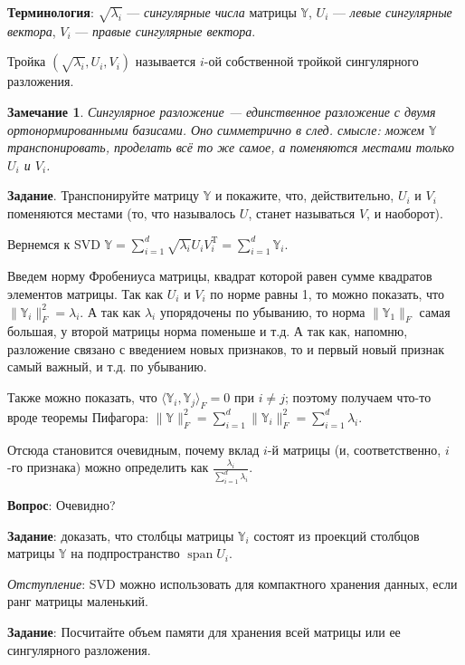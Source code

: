 \documentclass[specialist, 12pt,
subf, %
href, colorlinks=true,
substylefile = spbu.rtx,
]{disser}
\newtheorem{remark}{Замечание}
\DeclareMathOperator{\spn}{span}
\begin{document}
 \textbf{Терминология}:
 		$\sqrt{\lambda_i}$ --- \textit{сингулярные числа} матрицы $\mathbb{Y}$, $U_i$ --- \textit{левые сингулярные вектора}, $V_i$ --- \textit{правые сингулярные вектора}.
 		
 	Тройка $(\sqrt{\lambda_i},U_i,V_i)$ называется $i$-ой собственной тройкой сингулярного разложения.

\begin{remark}
	Сингулярное разложение --- единственное разложение с двумя ортонормированными базисами. Оно симметрично в след. смысле: можем $\mathbb{Y}$ транспонировать, проделать всё то же самое, а поменяются местами только $U_i$ и $V_i$.
\end{remark}

\textbf{Задание}. Транспонируйте матрицу $\mathbb{Y}$ и покажите, что, действительно, $U_i$ и $V_i$ поменяются местами (то, что называлось $U$, станет называться $V$, и наоборот).

\medskip
Вернемся к SVD $\mathbb{Y} = \sum\limits_{i = 1}^d \sqrt{\lambda_i} U_i V_i^{\mathrm{T}} = \sum\limits_{i = 1}^d \mathbb{Y}_i$.

Введем норму Фробениуса матрицы, квадрат которой равен сумме квадратов элементов матрицы. Так как $U_i$ и $V_i$ по норме равны 1, то можно показать, что $\|\mathbb{Y}_i\|_F^2 = \lambda_i$.  А так как $\lambda_i$ упорядочены по убыванию, то  норма $\|\mathbb{Y}_1\|_F$ самая большая, у второй матрицы норма поменьше и т.д.
А так как, напомню, разложение связано с введением новых признаков, то и первый новый признак самый важный, и т.д. по убыванию.

Также можно показать, что $\langle \mathbb{Y}_i, \mathbb{Y}_j\rangle_F = 0$ при $i\neq j$; поэтому получаем что-то вроде теоремы Пифагора: $\|\mathbb{Y}\|_F^2 = \sum\limits_{i = 1}^d \|\mathbb{Y}_i\|_F^2 = \sum\limits_{i = 1}^d \lambda_i$.

Отсюда становится очевидным, почему вклад $i$-й матрицы (и, соответственно, $i$-го признака) можно определить как $\displaystyle\frac{\lambda_i}{\sum_{i=1}^d \lambda_i}$.

\textbf{Вопрос}: Очевидно?

\textbf{Задание}: доказать, что столбцы матрицы $\mathbb{Y}_i$ состоят из проекций столбцов матрицы $\mathbb{Y}$ на подпространство $\spn{U_i}$.


\textit{Отступление}: SVD можно использовать для компактного хранения данных, если ранг матрицы маленький.

\textbf{Задание}: Посчитайте объем памяти для хранения всей матрицы или ее сингулярного разложения.
\end{document}
